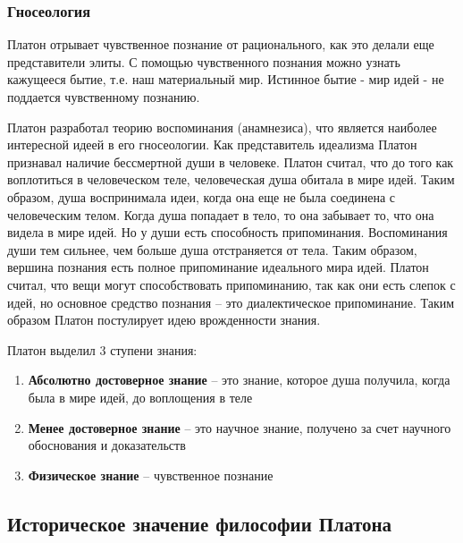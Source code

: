 \documentclass[a4paper, 14pt]{extreport}
\begin{document}
\subsubsection{Гносеология}

Платон отрывает чувственное познание от рационального, как это делали
еще представители элиты. С помощью чувственного познания можно узнать
кажущееся бытие, т.е. наш материальный мир. Истинное бытие - мир идей -
не поддается чувственному познанию.

Платон разработал теорию воспоминания (анамнезиса), что является
наиболее интересной идеей в его гносеологии. Как представитель идеализма
Платон признавал наличие бессмертной души в человеке. Платон считал, что
до того как воплотиться в человеческом теле, человеческая душа обитала в
мире идей. Таким образом, душа воспринимала идеи, когда она еще не была
соединена с человеческим телом. Когда душа попадает в тело, то она
забывает то, что она видела в мире идей. Но у души есть способность
припоминания. Воспоминания души тем сильнее, чем больше душа
отстраняется от тела. Таким образом, вершина познания есть полное
припоминание идеального мира идей. Платон считал, что вещи могут
способствовать припоминанию, так как они есть слепок с идей, но основное
средство познания -- это диалектическое припоминание. Таким образом
Платон постулирует идею врожденности знания.

Платон выделил 3 ступени знания:

\begin{enumerate}
\def\labelenumi{\arabic{enumi}.}

\item
  \textbf{Абсолютно достоверное знание} -- это знание, которое душа
  получила, когда была в мире идей, до воплощения в теле
\item
  \textbf{Менее достоверное знание} -- это научное знание, получено за
  счет научного обоснования и доказательств
\item
  \textbf{Физическое знание} -- чувственное познание
\end{enumerate}

\subsection{Историческое значение философии Платона}
\end{document}
